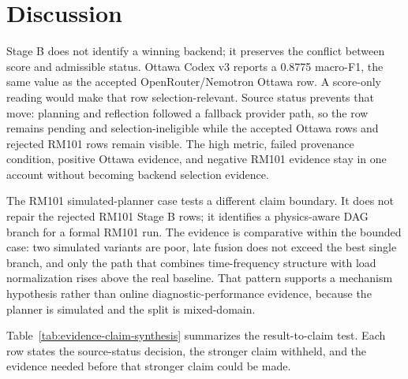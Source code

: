 \documentclass[11pt]{article}
\begin{document}
\section{Discussion}
Stage B does not identify a winning backend; it preserves the conflict between score and admissible status. Ottawa Codex v3 reports a 0.8775 macro-F1, the same value as the accepted OpenRouter/Nemotron Ottawa row. A score-only reading would make that row selection-relevant. Source status prevents that move: planning and reflection followed a fallback provider path, so the row remains pending and selection-ineligible while the accepted Ottawa rows and rejected RM101 rows remain visible. The high metric, failed provenance condition, positive Ottawa evidence, and negative RM101 evidence stay in one account without becoming backend selection evidence.

The RM101 simulated-planner case tests a different claim boundary. It does not repair the rejected RM101 Stage B rows; it identifies a physics-aware DAG branch for a formal RM101 run. The evidence is comparative within the bounded case: two simulated variants are poor, late fusion does not exceed the best single branch, and only the path that combines time-frequency structure with load normalization rises above the real baseline. That pattern supports a mechanism hypothesis rather than online diagnostic-performance evidence, because the planner is simulated and the split is mixed-domain.

Table~\ref{tab:evidence-claim-synthesis} summarizes the result-to-claim test. Each row states the source-status decision, the stronger claim withheld, and the evidence needed before that stronger claim could be made.
\end{document}
